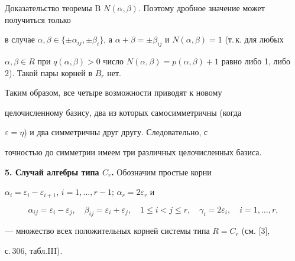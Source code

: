 \begin{pf*}{Доказательство теоремы B}
$N(\alpha,\beta)$. Поэтому дробное значение может получиться только


в случае $\alpha,\beta\in\{\pm\alpha_{ij},\pm\beta_i\}$, а $\alpha+\beta


=\pm\beta_{ij}$ и $N(\alpha,\beta)=1$ (т.\,к. для любых


$\alpha,\beta\in R$ при $q(\alpha,\beta)>0$ число $N(\alpha,\beta)=


p(\alpha,\beta)+1$ равно либо 1, либо 2). Такой пары корней в $B_r$ нет.





Таким образом, все четыре возможности приводят к новому


целочисленному базису, два из которых самосимметричны (когда


$\varepsilon=\eta$) и два симметричны друг другу. Следовательно, с


точностью до симметрии имеем три различных целочисленных базиса.


\end{pf*}





{\bf 5. Случай алгебры типа $C_r$.} Обозначим простые корни 


$\alpha_i=\varepsilon_i-\varepsilon_{i+1}$, $i=1,\dotsc,r-1$; $\alpha_r=


2\varepsilon_r$ и


$$


\alpha_{ij}=\varepsilon_i-\varepsilon_j,\quad


\beta_{ij}=\varepsilon_i+\varepsilon_j,\quad 1\le i<j\le r,\quad


\gamma_i=2\varepsilon_i,\quad i=1,\dotsc,r,


$$


--- множество всех положительных корней системы типа $R=C_r$ (см. [3],


с.\,306, табл.\;III).





